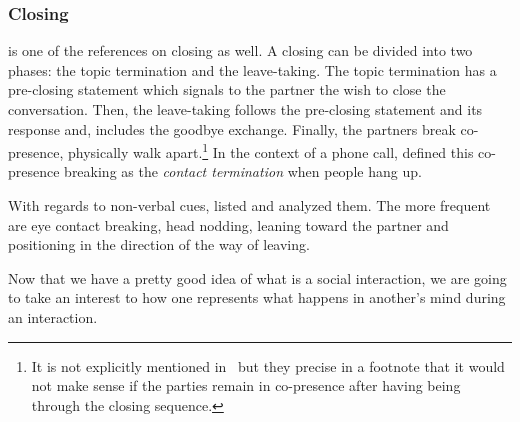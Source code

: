 \documentclass[a4paper,11pt,twoside]{StyleThese}
\begin{document}
\subsubsection{Closing}
\cite{schegloff_1973_opening} is one of the references on closing as well. A closing can be divided into two phases: the topic termination and the leave-taking.
The topic termination has a pre-closing statement which signals to the partner the wish to close the conversation. Then, the leave-taking follows the pre-closing statement and its response and, includes the goodbye exchange. Finally, the partners break co-presence, \ie physically walk apart.\footnote{It is not explicitly mentioned in~\citep{schegloff_1973_opening}  but they precise in a footnote that it would not make sense if the parties remain in co-presence after having being through the closing sequence.} In the context of a phone call, \cite{clark_1981_telephone} defined this co-presence breaking as the \emph{contact termination} when people hang up.

With regards to non-verbal cues, \cite{knapp_1973_rhetoric} listed and analyzed them. The more frequent are eye contact breaking, head nodding, leaning toward the partner and positioning in the direction of the way of leaving.

\bigskip

Now that we have a pretty good idea of what is a social interaction, we are going to take an interest to how one represents what happens in another's mind during an interaction.
\end{document}
